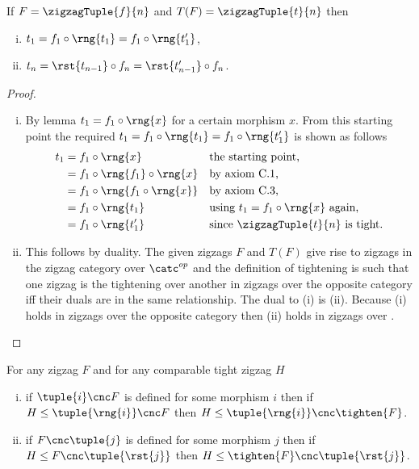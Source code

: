 \begin{lemma}
If $F=\zigzagTuple{f}{n}$ and $T(F)=\zigzagTuple{t}{n}$ then
\begin{enumerate}[(i)]
\item $t_1 = f_1 \circ \rng{t_1} = f_1 \circ \rng{t'_1}$,
\item $t_n = \rst{t_{n-1}} \circ f_n = \rst{t'_{n-1}} \circ f_n$.
\end{enumerate}
\end{lemma}
\begin{proof}
~ %
\begin{enumerate}[(i)]
\item
By lemma 
$t_1=f_1 \circ \rng{x}$
for a certain morphism $x$.
From this starting point the required 
$t_1 = f_1 \circ \rng{t_1} = f_1 \circ \rng{t'_1}$
is shown as follows
\begin{align*}
t_1 &= f_1 \circ \rng{x} 
        &&\mbox{the starting point,} \\
    &= f_1 \circ \rng{f_1} \circ \rng{x}
        && \mbox{by axiom C.1,}  \\
    &= f_1 \circ \rng{f_1 \circ \rng{x}}
        && \mbox{by  axiom C.3,} \\
    &= f_1 \circ \rng{t_1}
        && \mbox{using $t_1=f_1 \circ \rng{x}$ again,} \\
    &= f_1 \circ \rng{t'_1}
        && \mbox{since $\zigzagTuple{t}{n}$ is tight.}
\end{align*}
\item
This follows by duality. The given zigzags $F$ and $T(F)$ give rise to zigzags
in the zigzag category over $\catc^{op}$ and the definition of tightening is such that one zigzag is the tightening over another in zigzags over the opposite category iff their duals are in the same relationship. The dual to (i) is (ii). Because (i) holds in zigzags over the opposite category then (ii) holds in zigzags over \catc.  
\end{enumerate}
\end{proof}
\begin{lemma}
For any zigzag $F$ and for any comparable tight zigzag $H$
\begin{enumerate}[(i)]
\item if $\tuple{i} \cnc F$ is defined for some morphism $i$ then
if  $H \leq \tuple{\rng{i}} \cnc F$
then $H \leq  \tuple{\rng{i}} \cnc \tighten{F}$.
\item if $F\cnc\tuple{j}$ is defined for some morphism $j$ then
if  $H \leq F \cnc \tuple{\rst{j}}$
then $H \leq  \tighten{F} \cnc \tuple{\rst{j}}$.
\end{enumerate}
\end{lemma}
